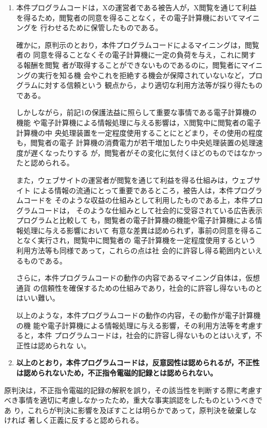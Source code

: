 \documentclass[12pt,a4paper]{ltjsarticle}
\begin{document}
\begin{enumerate}
  \item 本件プログラムコードは，Xの運営者である被告人が，X閲覧を通じて利益
        を得るため，閲覧者の同意を得ることなく，その電子計算機においてマイニングを
        行わせるために保管したものである。

        確かに，原判示のとおり，本件プログラムコードによるマイニングは，閲覧者の
        同意を得ることなくその電子計算機に一定の負荷を与え，これに関する報酬を閲覧
        者が取得することができないものであるのに，閲覧者にマイニングの実行を知る機
        会やこれを拒絶する機会が保障されていないなど，プログラムに対する信頼という
        観点から，より適切な利用方法等が採り得たものである。

        しかしながら，前記1の保護法益に照らして重要な事情である電子計算機の機能
        や電子計算機による情報処理に与える影響は，X閲覧中に閲覧者の電子計算機の中
        央処理装置を一定程度使用することにとどまり，その使用の程度も，閲覧者の電子
        計算機の消費電力が若干増加したり中央処理装置の処理速度が遅くなったりする
        が，閲覧者がその変化に気付くほどのものではなかったと認められる。

        また，ウェブサイトの運営者が閲覧を通じて利益を得る仕組みは，ウェブサイト
        による情報の流通にとって重要であるところ，被告人は，本件プログラムコードを
        そのような収益の仕組みとして利用したものである上，本件プログラムコードは，
        そのような仕組みとして社会的に受容されている広告表示プログラムと比較して
        も，閲覧者の電子計算機の機能や電子計算機による情報処理に与える影響において
        有意な差異は認められず，事前の同意を得ることなく実行され，閲覧中に閲覧者の
        電子計算機を一定程度使用するという利用方法等も同様であって，これらの点は社
        会的に許容し得る範囲内といえるものである。

        さらに，本件プログラムコードの動作の内容であるマイニング自体は，仮想通貨
        の信頼性を確保するための仕組みであり，社会的に許容し得ないものとはいい難い。

        以上のような，本件プログラムコードの動作の内容，その動作が電子計算機の機
        能や電子計算機による情報処理に与える影響，その利用方法等を考慮すると，本件
        プログラムコードは，社会的に許容し得ないものとはいえず，不正性は認められな
        い。

  \item \textbf{以上のとおり，本件プログラムコードは，反意図性は認められるが，不正性
        は認められないため，不正指令電磁的記録とは認められない。}
 \end{enumerate}
 原判決は，不正指令電磁的記録の解釈を誤り，その該当性を判断する際に考慮す
 べき事情を適切に考慮しなかったため，重大な事実誤認をしたものというべきであ
 り，これらが判決に影響を及ぼすことは明らかであって，原判決を破棄しなければ
 著しく正義に反すると認められる。
\end{document}
